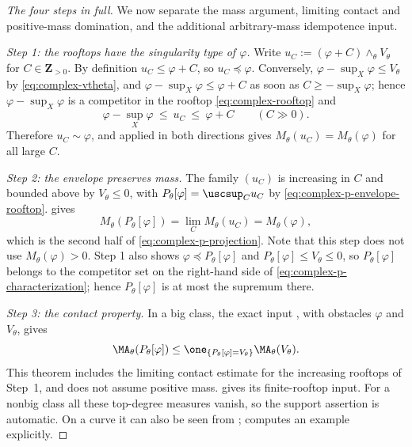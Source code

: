 \begin{proof}[The four steps in full]
We now separate the mass argument, limiting contact and positive-mass
domination, and the additional arbitrary-mass idempotence input.

\emph{Step 1: the rooftops have the singularity type of $\varphi$.}
Write $u_C:=(\varphi+C)\wedge_\theta V_\theta$ for
$C\in\mathbf Z_{>0}$.  By definition $u_C\leq\varphi+C$, so
$u_C\preceq\varphi$.  Conversely, $\varphi-\sup_X\varphi\leq V_\theta$
by \eqref{eq:complex-vtheta}, and $\varphi-\sup_X\varphi\leq\varphi+C$
as soon as $C\geq-\sup_X\varphi$; hence $\varphi-\sup_X\varphi$ is a
competitor in the rooftop \eqref{eq:complex-rooftop} and
\[
 \varphi-\sup_X\varphi\ \leq\ u_C\ \leq\ \varphi+C
 \qquad(C\gg0).
\]
Therefore $u_C\sim\varphi$, and
 applied in both directions gives
$M_\theta(u_C)=M_\theta(\varphi)$ for all large $C$.

\emph{Step 2: the envelope preserves mass.}  The family $(u_C)$ is
increasing in $C$ and bounded above by $V_\theta\leq0$, with
$P_\theta[\varphi]=\uscsup_Cu_C$ by
\eqref{eq:complex-p-envelope-rooftop}.  
gives
\[
 M_\theta(P_\theta[\varphi])=\lim_CM_\theta(u_C)=M_\theta(\varphi),
\]
which is the second half of \eqref{eq:complex-p-projection}.  Note that
this step does not use $M_\theta(\varphi)>0$.  Step 1 also shows
$\varphi\preceq P_\theta[\varphi]$ and
$P_\theta[\varphi]\leq V_\theta\leq0$, so $P_\theta[\varphi]$ belongs
to the competitor set on the right-hand side of
\eqref{eq:complex-p-characterization}; hence $P_\theta[\varphi]$ is at
most the supremum there.

\emph{Step 3: the contact property.}  In a big class, the exact input
\cite[Theorem~3.8]{DDNL18mono}, with obstacles $\varphi$ and $V_\theta$,
gives
\[
 \MA_\theta(P_\theta[\varphi])\leq
 \one_{\{P_\theta[\varphi]=V_\theta\}}\MA_\theta(V_\theta).
\]
This theorem includes the limiting contact estimate for the increasing
rooftops of Step~1, and does not assume positive mass.
 gives its finite-rooftop input.
For a nonbig class all these top-degree measures vanish, so the support
assertion is automatic.  On a curve it can also be seen from
; 
computes an example explicitly.


\end{proof}
